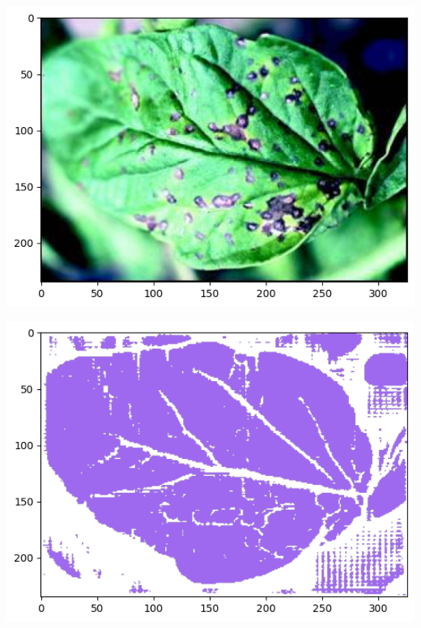 \begin{center}
    \begin{minipage}{0.3\linewidth}
    \includegraphics[width=\linewidth]{images/leaf.png}
    \end{minipage}%
    \begin{minipage}{0.3\linewidth}
    \includegraphics[width=\linewidth]{images/leaf_0seg.png}
    \end{minipage}%
    \begin{minipage}{0.3\linewidth}

\end{minipage}
\end{center}
